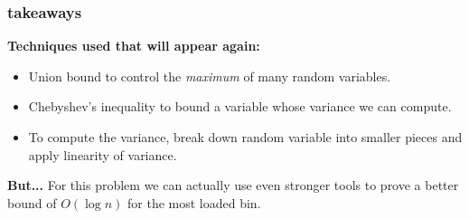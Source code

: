 \documentclass[compress]{beamer}
\begin{document}
\begin{frame}
	\frametitle{takeaways}
	\textbf{Techniques used that will appear again:}
	\begin{itemize}
		\item Union bound to control the \emph{maximum} of many random variables. 
		\item Chebyshev's inequality to bound a variable whose variance we can compute.
		\item To compute the variance, break down random variable into smaller pieces and apply linearity of variance. 
	\end{itemize}
	
	\textbf{But...}
	For this problem we can actually use even stronger tools to prove a better bound of \emph{$O(\log n)$} for the most loaded bin.
	
\end{frame}
\end{document}
